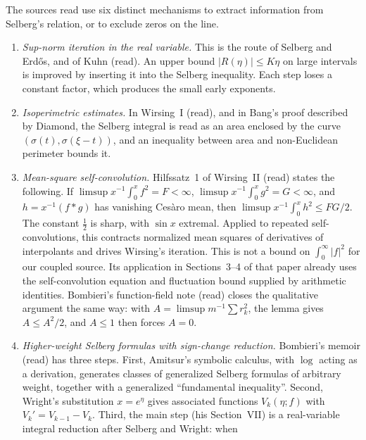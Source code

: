 \documentclass[11pt,letterpaper]{article}
\numberwithin{equation}{section}
\theoremstyle{definition}
\theoremstyle{remark}
\begin{document}
The sources read use six distinct mechanisms to extract information from
Selberg's relation, or to exclude zeros on the line.
\begin{enumerate}
 \item[(K)] \emph{Sup-norm iteration in the real variable.} This is the
       route of Selberg and Erd\H{o}s, and of Kuhn \cite{kuhn} (read). An
       upper bound $|R(\eta)|\le K\eta$ on large intervals is improved by
       inserting it into the Selberg inequality. Each step loses a constant
       factor, which produces the small early exponents.
 \item[(I)] \emph{Isoperimetric estimates.} In Wirsing~I \cite{wirsing1}
       (read), and in Bang's proof described by Diamond, the Selberg
       integral is read as an area enclosed by the curve
       $(\sigma(t),\sigma(\xi-t))$, and an inequality between area and
       non-Euclidean perimeter bounds it.
 \item[(W)] \emph{Mean-square self-convolution.} Hilfssatz~1 of
       Wirsing~II \cite{wirsing2} (read) states the following. If
       $\limsup x^{-1}\int_0^x f^2=F<\infty$,
       $\limsup x^{-1}\int_0^x g^2=G<\infty$, and
       $h=x^{-1}(f*g)$ has vanishing Ces\`aro mean, then
       $\limsup x^{-1}\int_0^x h^2\le FG/2$. The constant $\tfrac12$ is
       sharp, with $\sin x$ extremal. Applied to repeated self-convolutions,
       this contracts normalized mean squares of derivatives of
       interpolants and drives Wirsing's iteration. This is not a bound
       on $\int_0^\infty|f|^2$ for our coupled source. Its application in
       Sections~3--4 of that paper already uses the self-convolution
       equation and fluctuation bound supplied by arithmetic identities.
       Bombieri's function-field note \cite{bombieri-ff} (read) closes the
       qualitative argument the same way: with $A=\limsup m^{-1}\sum r_k^2$,
       the lemma gives $A\le A^2/2$, and $A\le1$ then forces $A=0$.
 \item[(B)] \emph{Higher-weight Selberg formulas with sign-change
       reduction.} Bombieri's memoir \cite{bombieri} (read) has three
       steps. First, Amitsur's symbolic calculus, with $\log$ acting as a
       derivation, generates classes of generalized Selberg formulas of
       arbitrary weight, together with a generalized ``fundamental
       inequality''. Second, Wright's substitution $x=e^\eta$ gives
       associated functions $V_k(\eta;f)$ with
       $V_k'=V_{k-1}-V_k$. Third, the main step (his Section~VII) is a
       real-variable integral reduction after Selberg and Wright: when

\end{enumerate}
\end{document}
